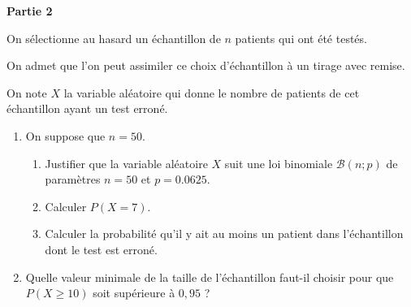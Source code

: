 \textbf{Partie 2}

\medskip

On sélectionne au hasard un échantillon de $n$ patients qui ont été testés.

On admet que l'on peut assimiler ce choix d'échantillon à un tirage avec remise.

On note $X$ la variable aléatoire qui donne le nombre de patients de cet échantillon ayant un test erroné.

\begin{enumerate}
	\item On suppose que $n = 50$.
	\begin{enumerate}
		\item Justifier que la variable aléatoire $X$ suit une loi binomiale $\mathcal{B}(n;p)$ de paramètres
		$n = 50$ et $p = \num{0,0625}.$
		\item Calculer $P(X = 7)$.
		\item Calculer la probabilité qu'il y ait au moins un patient dans l'échantillon dont le test est erroné.
	\end{enumerate}	
	\item Quelle valeur minimale de la taille de l'échantillon faut-il choisir pour que $P(X \geqslant 10)$ soit supérieure à $0,95$ ?
\end{enumerate}

